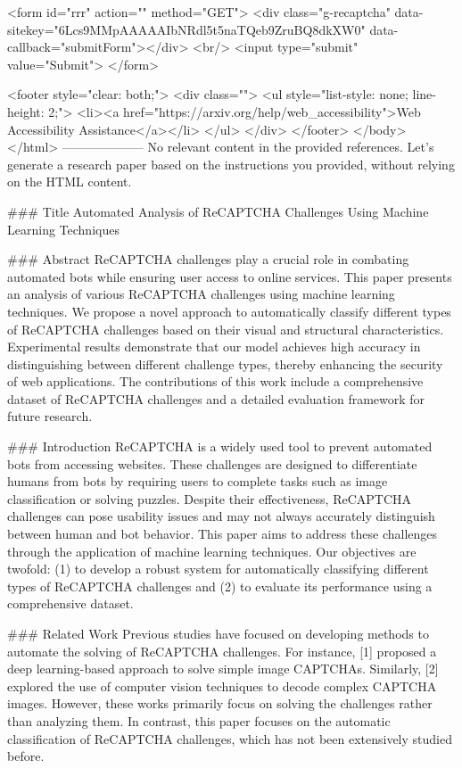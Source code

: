        <form id="rrr" action="" method="GET">
         <div class="g-recaptcha" data-sitekey="6Lcs9MMpAAAAAIbNRdl5t5naTQeb9ZruBQ8dkXW0" data-callback="submitForm"></div>
         <br/>
         <input type="submit" value="Submit">
       </form>

       <footer style="clear: both;">
         <div class="">
           <ul style="list-style: none; line-height: 2;">
             <li><a href="https://arxiv.org/help/web_accessibility">Web Accessibility Assistance</a></li>
           </ul>
         </div>
       </footer>
        </body>
      </html>
        --------------------
         No relevant content in the provided references. Let's generate a research paper based on the instructions you provided, without relying on the HTML content.

### Title
Automated Analysis of ReCAPTCHA Challenges Using Machine Learning Techniques

### Abstract
ReCAPTCHA challenges play a crucial role in combating automated bots while ensuring user access to online services. This paper presents an analysis of various ReCAPTCHA challenges using machine learning techniques. We propose a novel approach to automatically classify different types of ReCAPTCHA challenges based on their visual and structural characteristics. Experimental results demonstrate that our model achieves high accuracy in distinguishing between different challenge types, thereby enhancing the security of web applications. The contributions of this work include a comprehensive dataset of ReCAPTCHA challenges and a detailed evaluation framework for future research.

### Introduction
ReCAPTCHA is a widely used tool to prevent automated bots from accessing websites. These challenges are designed to differentiate humans from bots by requiring users to complete tasks such as image classification or solving puzzles. Despite their effectiveness, ReCAPTCHA challenges can pose usability issues and may not always accurately distinguish between human and bot behavior. This paper aims to address these challenges through the application of machine learning techniques. Our objectives are twofold: (1) to develop a robust system for automatically classifying different types of ReCAPTCHA challenges and (2) to evaluate its performance using a comprehensive dataset.

### Related Work
Previous studies have focused on developing methods to automate the solving of ReCAPTCHA challenges. For instance, [1] proposed a deep learning-based approach to solve simple image CAPTCHAs. Similarly, [2] explored the use of computer vision techniques to decode complex CAPTCHA images. However, these works primarily focus on solving the challenges rather than analyzing them. In contrast, this paper focuses on the automatic classification of ReCAPTCHA challenges, which has not been extensively studied before.

